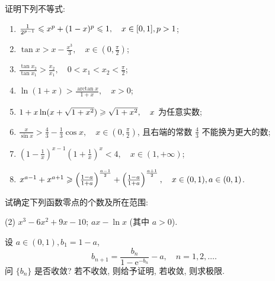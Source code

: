 \begin{exercise}[3.3.23]
    证明下列不等式:
    \begin{enumerate}
        \item $\frac{1}{2^{p-1}} \leqslant x^p+(1-x)^p \leqslant 1, \quad x \in [0,1], p>1$;
        \item $\tan x > x - \frac{x^3}{3}, \quad x \in (0, \frac{\pi}{2})$;
        \item $\frac{\tan x_2}{\tan x_1} > \frac{x_2}{x_1}, \quad 0<x_1<x_2<\frac{\pi}{2}$;
        \item $\ln(1+x) > \frac{\arctan x}{1+x}, \quad x>0$;
        \item $1+x\ln(x+\sqrt{1+x^2}) \geqslant \sqrt{1+x^2}, \quad x$ 为任意实数;
        \item $\frac{x}{\sin x} > \frac{4}{3} - \frac{1}{3}\cos x, \quad x \in (0, \frac{\pi}{2})$, 且右端的常数 $\frac{4}{3}$ 不能换为更大的数;
        \item $(1-\frac{1}{x})^{x-1} (1+\frac{1}{x})^x < 4, \quad x \in (1, +\infty)$;
        \item $x^{a-1}+x^{a+1} \geqslant \left(\frac{1-a}{1+a}\right)^{\frac{a-1}{2}} + \left(\frac{1-a}{1+a}\right)^{\frac{a+1}{2}}, \quad x \in (0,1), a \in (0,1)$.
    \end{enumerate}
\end{exercise}

\begin{exercise}[3.3.24]
    试确定下列函数零点的个数及所在范围:
    \begin{tasks}[label=(\arabic*)](2)
        \task $x^3-6x^2+9x-10$;
        \task $ax-\ln x$ (其中 $a>0$).
    \end{tasks}
\end{exercise}

\begin{exercise}[3.3.25]
    设 $a \in (0,1), b_1=1-a$,
    $$ b_{n+1} = \frac{b_n}{1-\mathrm{e}^{-b_n}} - a, \quad n=1,2,\dots. $$
    问 $\{b_n\}$ 是否收敛? 若不收敛, 则给予证明, 若收敛, 则求极限.
\end{exercise}

\newpage
